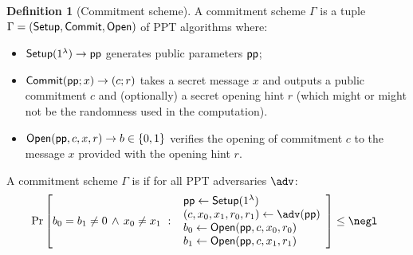 \documentclass{article}
\theoremstyle{definition}
\newtheorem{definition}{Definition}
\newcommand{\ben}[1]{{\textcolor{green}{[Ben: #1]}}}
\newcommand{\alan}[1]{{\todo[color=blue!40!white]{Alan: #1}}}
\newcommand{\ben}[1]{}
\newcommand{\alan}[1]{}
\begin{document}
\begin{definition}[Commitment scheme]
A commitment scheme $\Gamma$ is a tuple $\Gamma = (\textsf{{Setup}}, \textsf{{Commit}}, \textsf{{Open}})$ of PPT algorithms where:
\begin{itemize}
    \item $\textsf{{Setup}}(1^\lambda) \rightarrow \textsf{pp}$ generates public parameters $\textsf{pp}$;
    \item $\textsf{{Commit}}(\textsf{pp}; x) \rightarrow (c; r)$ takes a secret message $x$ and outputs a public commitment $c$ and (optionally) a secret opening hint $r$ (which might or might not be the randomness used in the computation).
    \item $\textsf{{Open}}(\textsf{pp}, c, x, r) \rightarrow b \in \{0, 1\}$ verifies the opening of commitment $c$ to the message $x$ provided with the opening hint $r$. 
\end{itemize}

A commitment scheme $\Gamma$ is  if for all PPT adversaries $\adv$:
\[
    \Pr\left[
        b_0 = b_1 \neq 0 \, \wedge \, x_0 \neq x_1 \ : \
        \begin{array}{l}
             \params \gets \pro{Setup}(1^\lambda) \\
             (c, x_0, x_1, r_0, r_1) \gets \adv(\params) \\
             b_0 \gets \pro{Open}(\params, c, x_0, r_0) \\
             b_1 \gets \pro{Open}(\params, c, x_1, r_1) \\
        \end{array}
    \right] \leq \negl \enspace 
\]

\begin{comment}
A commitment scheme $\Gamma$ is \defn{hiding} if for all probabilistic polynomial time adversaries $\adv=(\adv_0,\adv_1)$,
\[
    \left|
        1 - 2\Pr\left[
            \hat{b} = b \ : \
        \begin{array}{l}
             \params \gets \pro{Setup}(1^\lambda) \\
             (\state, x_0, x_1) \gets \adv_0(\params) \\
             b \sample \{0,1\} \\
             (\gr{C}; *) \gets \pro{Commit}(\params; x_b) \\
             \hat{b} \gets \adv_1(\state, \gr{C})
        \end{array}
        \right]
    \right| \leq \negl \enspace .
\]
\end{comment}
\end{definition}
\end{document}
